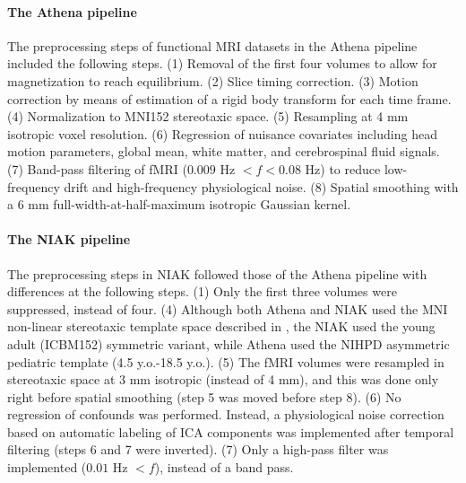 \documentclass[preprint,12pt,3p]{elsarticle}
\begin{document}
\paragraph{The Athena pipeline} The preprocessing steps of functional MRI datasets in the Athena pipeline included the following steps. (1) Removal of the first four volumes to allow for magnetization to reach equilibrium. (2) Slice timing correction. (3) Motion correction by means of estimation of a rigid body transform for each time frame. (4) Normalization to MNI152 stereotaxic space. (5) Resampling at 4 mm isotropic voxel resolution. (6) Regression of nuisance covariates including head motion parameters, global mean, white matter, and cerebrospinal ﬂuid signals. (7) Band-pass filtering of fMRI ($0.009$ Hz $< f < 0.08$ Hz) to reduce low-frequency drift and high-frequency physiological noise. (8) Spatial smoothing with a 6 mm full-width-at-half-maximum isotropic Gaussian kernel.

\paragraph{The NIAK pipeline} The preprocessing steps in NIAK followed those of the Athena pipeline with differences at the following steps. (1) Only the first three volumes were suppressed, instead of four. (4) Although both Athena and NIAK used the MNI non-linear stereotaxic template space described in \citep{fonov2011unbiased}, the NIAK used the young adult (ICBM152) symmetric variant, while Athena used the NIHPD asymmetric pediatric template (4.5 y.o.-18.5 y.o.). (5) The fMRI volumes were resampled in stereotaxic space at 3 mm isotropic (instead of 4 mm), and this was done only right before spatial smoothing (step 5 was moved before step 8). (6) No regression of confounds was performed. Instead, a physiological noise correction based on automatic labeling of ICA components was implemented \citep{perlbarg2007corsica} after temporal filtering (steps 6 and 7 were inverted). (7) Only a high-pass filter was implemented ($0.01$ Hz $< f$), instead of a band pass. 
\end{document}
